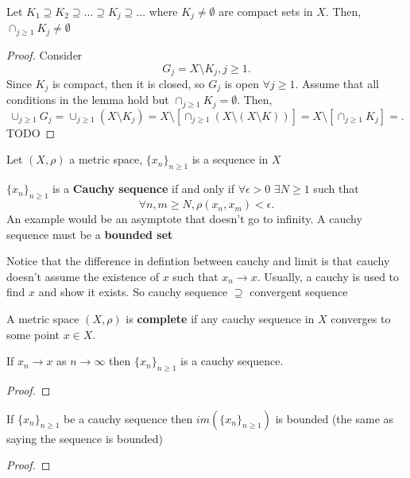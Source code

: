\documentclass[a4paper]{article}
\begin{document}
\begin{lemma}
  Let $K_1 \supseteq K_2 \supseteq \ldots \supseteq K_j \supseteq \ldots$ where $K_j \neq \emptyset$ are compact sets in $X$. Then,  $\cap_{j \geq 1} K_j \neq \emptyset$
  \begin{proof}
    Consider 
    \[
    G_j = X \setminus K_j, j \geq 1
    .\]
    Since $K_j$ is compact, then it is closed, so  $G_j$ is open $\forall j \geq 1$.  Assume that all conditions in the lemma hold but $\cap_{j \geq 1} K_j = \emptyset$. Then, 
    \[
      \cup_{j \geq 1} G_j = \cup_{j \geq 1} \left( X \setminus K_j \right) =X \setminus [\cap_{j \geq 1} \left( X \setminus (X \setminus K) \right)]= X \setminus [\cap_{j \geq 1} K_j] =   
    .\] 
    TODO

  \end{proof}
\end{lemma} 
Let $\left( X, \rho \right) $ a metric space, $\{x_n\}_{n \geq 1} $ is a sequence in $X$

\begin{definition}
  $\{x_n\}_{n \geq 1} $ is a \textbf{Cauchy sequence} if and only if  $\forall \epsilon > 0$ $\exists N \geq 1$ such that 
  \[
    \forall n,m \geq N, \rho(x_n,x_m) < \epsilon
  .\] 
  An example would be an asymptote that doesn't go to infinity. A cauchy sequence must be a \textbf{bounded set} 
\end{definition}

\begin{note}
  Notice that the difference in defintion between cauchy and limit is that cauchy doesn't assume the existence of $x$ such that  $x_n \to x$. Usually, a cauchy is used to find $x$ and show it exists. So cauchy sequence  $\supseteq$ convergent sequence 
\end{note}

\begin{definition}
  A metric space $\left( X,\rho \right)  $ is \textbf{complete} if any cauchy sequence in  $X$ converges to some point  $x \in X$.  
\end{definition}

\begin{prop}
  If $x_n \to x$ as  $n \to \infty$  then $\{x_n\}_{n \geq 1} $ is a cauchy sequence.

  \begin{proof}
    
  \end{proof}
\end{prop}

\begin{prop}
 If $\{x_{n}\}_{n \geq 1}$ be a cauchy sequence then $im(\{x_n\}_{n \geq 1})$ is bounded (the same as saying the sequence is bounded) 
 \begin{proof}
   
 \end{proof}
\end{prop}
\end{document}
